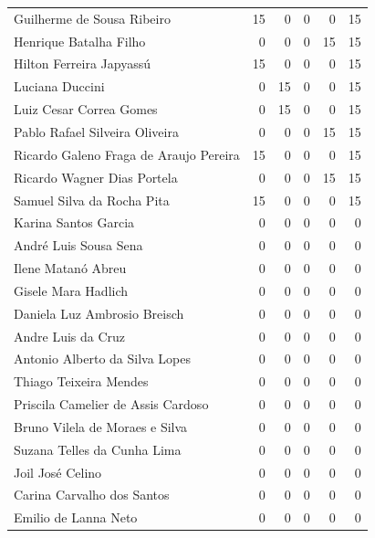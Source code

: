 \documentclass[12pt,brazil]{article}\usepackage[]{graphicx}\usepackage[]{xcolor}
\begin{document}
\begin{longtable}{lrrrrr}
Guilherme de Sousa Ribeiro & 15 & 0 & 0 & 0 & 15 \\
Henrique Batalha Filho & 0 & 0 & 0 & 15 & 15 \\
Hilton Ferreira Japyassú & 15 & 0 & 0 & 0 & 15 \\
Luciana Duccini & 0 & 15 & 0 & 0 & 15 \\
Luiz Cesar Correa Gomes & 0 & 15 & 0 & 0 & 15 \\
Pablo Rafael Silveira Oliveira & 0 & 0 & 0 & 15 & 15 \\
Ricardo Galeno Fraga de Araujo Pereira & 15 & 0 & 0 & 0 & 15 \\
Ricardo Wagner Dias Portela & 0 & 0 & 0 & 15 & 15 \\
Samuel Silva da Rocha Pita & 15 & 0 & 0 & 0 & 15 \\
Karina Santos Garcia & 0 & 0 & 0 & 0 & 0 \\
André Luis Sousa Sena & 0 & 0 & 0 & 0 & 0 \\
Ilene Matanó Abreu & 0 & 0 & 0 & 0 & 0 \\
Gisele Mara Hadlich & 0 & 0 & 0 & 0 & 0 \\
Daniela Luz Ambrosio Breisch & 0 & 0 & 0 & 0 & 0 \\
Andre Luis da Cruz & 0 & 0 & 0 & 0 & 0 \\
Antonio Alberto da Silva Lopes & 0 & 0 & 0 & 0 & 0 \\
Thiago Teixeira Mendes & 0 & 0 & 0 & 0 & 0 \\
Priscila Camelier de Assis Cardoso & 0 & 0 & 0 & 0 & 0 \\
Bruno Vilela de Moraes e Silva & 0 & 0 & 0 & 0 & 0 \\
Suzana Telles da Cunha Lima & 0 & 0 & 0 & 0 & 0 \\
Joil José Celino & 0 & 0 & 0 & 0 & 0 \\
\hline Carina Carvalho dos Santos & 0 & 0 & 0 & 0 & 0 \\
Emilio de Lanna Neto & 0 & 0 & 0 & 0 & 0 \\
\end{longtable}


\clearpage
\end{document}
